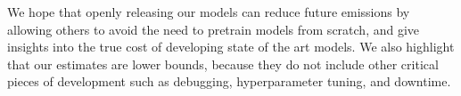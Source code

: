 
We hope that openly releasing our models can reduce future emissions by allowing others to avoid the need to pretrain models from scratch, and give insights into the true cost of developing state of the art models. We also highlight that our estimates are lower bounds, because they do not include other critical pieces of development such as debugging, hyperparameter tuning, and downtime.

